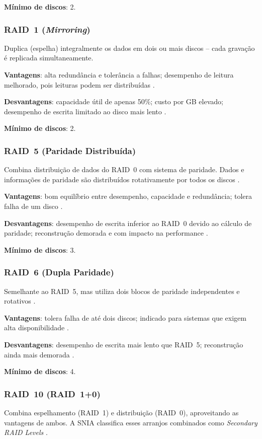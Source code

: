 \textbf{Mínimo de discos}: 2.

\subsubsection*{RAID~1 (\textit{Mirroring})}
Duplica (espelha) integralmente os dados em dois ou mais discos – cada gravação é replicada simultaneamente.

\textbf{Vantagens}: alta redundância e tolerância a falhas; desempenho de leitura melhorado, pois leituras podem ser distribuídas \cite{techtarget2023}.

\textbf{Desvantagens}: capacidade útil de apenas 50\%; custo por GB elevado; desempenho de escrita limitado ao disco mais lento \cite{techtarget2023}.

\textbf{Mínimo de discos}: 2.

\subsubsection*{RAID~5 (Paridade Distribuída)}
Combina distribuição de dados do RAID~0 com sistema de paridade. Dados e informações de paridade são distribuídos rotativamente por todos os discos \cite{snia2016}.

\textbf{Vantagens}: bom equilíbrio entre desempenho, capacidade e redundância; tolera falha de um disco \cite{techtarget2023}.

\textbf{Desvantagens}: desempenho de escrita inferior ao RAID~0 devido ao cálculo de paridade; reconstrução demorada e com impacto na performance \cite{lee2021}.

\textbf{Mínimo de discos}: 3.

\subsubsection*{RAID~6 (Dupla Paridade)}
Semelhante ao RAID~5, mas utiliza dois blocos de paridade independentes e rotativos \cite{snia2016}.

\textbf{Vantagens}: tolera falha de até dois discos; indicado para sistemas que exigem alta disponibilidade \cite{lee2021, snia2016}.

\textbf{Desvantagens}: desempenho de escrita mais lento que RAID~5; reconstrução ainda mais demorada \cite{lee2021}.

\textbf{Mínimo de discos}: 4.

\subsubsection*{RAID~10 (RAID~1+0)}
Combina espelhamento (RAID~1) e distribuição (RAID~0), aproveitando as vantagens de ambos. A SNIA classifica esses arranjos combinados como \textit{Secondary RAID Levels} ‎\cite{snia2016}.

